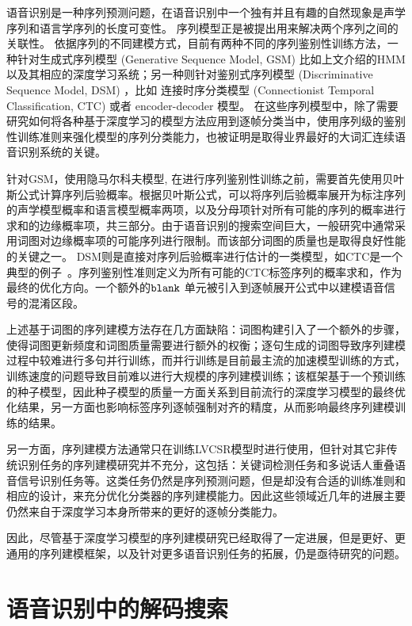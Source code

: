 语音识别是一种序列预测问题，在语音识别中一个独有并且有趣的自然现象是声学序列和语言学序列的长度可变性。
序列模型正是被提出用来解决两个序列之间的关联性。
依据序列的不同建模方式，目前有两种不同的序列鉴别性训练方法，一种针对生成式序列模型 (Generative Sequence Model, GSM) 比如上文介绍的HMM以及其相应的深度学习系统；另一种则针对鉴别式序列模型 (Discriminative Sequence Model, DSM) ，比如 连接时序分类模型 (Connectionist Temporal Classification, CTC) 或者 encoder-decoder 模型。 
在这些序列模型中，除了需要研究如何将各种基于深度学习的模型方法应用到逐帧分类当中，使用序列级的鉴别性训练准则来强化模型的序列分类能力，也被证明是取得业界最好的大词汇连续语音识别系统的关键。

针对GSM，使用隐马尔科夫模型, 在进行序列鉴别性训练之前，需要首先使用贝叶斯公式计算序列后验概率。根据贝叶斯公式，可以将序列后验概率展开为标注序列的声学模型概率和语言模型概率两项，以及分母项针对所有可能的序列的概率进行求和的边缘概率项，共三部分。由于语音识别的搜索空间巨大，一般研究中通常采用词图对边缘概率项的可能序列进行限制。而该部分词图的质量也是取得良好性能的关键之一。
%
DSM则是直接对序列后验概率进行估计的一类模型，如CTC是一个典型的例子~\cite{graves2006connectionist,huang2018ctc}。序列鉴别性准则定义为所有可能的CTC标签序列的概率求和，作为最终的优化方向。一个额外的$\tt blank$ 单元被引入到逐帧展开公式中以建模语音信号的混淆区段。

上述基于词图的序列建模方法存在几方面缺陷：词图构建引入了一个额外的步骤，使得词图更新频度和词图质量需要进行额外的权衡；逐句生成的词图导致序列建模过程中较难进行多句并行训练，而并行训练是目前最主流的加速模型训练的方式，训练速度的问题导致目前难以进行大规模的序列建模训练；该框架基于一个预训练的种子模型，因此种子模型的质量一方面关系到目前流行的深度学习模型的最终优化结果，另一方面也影响标签序列逐帧强制对齐的精度，从而影响最终序列建模训练的结果。

另一方面，序列建模方法通常只在训练LVCSR模型时进行使用，但针对其它非传统识别任务的序列建模研究并不充分，这包括：关键词检测任务和多说话人重叠语音信号识别任务等。这类任务仍然是序列预测问题，但是却没有合适的训练准则和相应的设计，来充分优化分类器的序列建模能力。因此这些领域近几年的进展主要仍然来自于深度学习本身所带来的更好的逐帧分类能力。

因此，尽管基于深度学习模型的序列建模研究已经取得了一定进展，但是更好、更通用的序列建模框架，以及针对更多语音识别任务的拓展，仍是亟待研究的问题。


\section{语音识别中的解码搜索}
\label{chap:intro0-inf}

